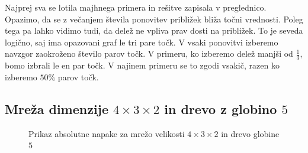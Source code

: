 \documentclass[a4paper, 16pt]{article}
\begin{document}
    Najprej sva se lotila majhnega primera in rešitve zapisala v preglednico. Opazimo, da se z večanjem števila ponovitev približek bliža točni vrednosti.
    Poleg tega pa lahko vidimo tudi, da delež ne vpliva prav dosti na približek. To je seveda logično, saj ima opazovani graf le tri pare točk. 
    V vsaki ponovitvi izberemo navzgor zaokroženo število parov točk. V primeru, ko izberemo delež manjši od $ \frac{1}{3}$, bomo izbrali le en par točk.
    V najinem primeru se to zgodi vsakič, razen ko izberemo $50 \%$ parov točk.

    \subsection{Mreža dimenzije $4 \times 3 \times 2$ in drevo z globino $5$}
    \begin{figure}[!h]
        \caption{Prikaz absolutne napake za mrežo velikosti $4 \times 3 \times 2$ in drevo globine $5$}
        \label{fig: napaka}
    \end{figure}
\end{document}
